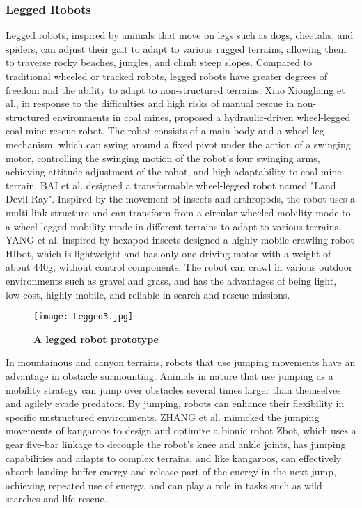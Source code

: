 \documentclass[conference]{IEEEtran}
\begin{document}
\subsubsection{Legged Robots}
Legged robots, inspired by animals that move on legs such as dogs, cheetahs, and spiders, can adjust their gait to adapt to various rugged terrains, allowing them to traverse rocky beaches, jungles, and climb steep slopes. Compared to traditional wheeled or tracked robots, legged robots have greater degrees of freedom and the ability to adapt to non-structured terrains\cite{b31}. Xiao Xiongliang et al.\cite{b32}, in response to the difficulties and high risks of manual rescue in non-structured environments in coal mines, proposed a hydraulic-driven wheel-legged coal mine rescue robot. The robot consists of a main body and a wheel-leg mechanism, which can swing around a fixed pivot under the action of a swinging motor, controlling the swinging motion of the robot's four swinging arms, achieving attitude adjustment of the robot, and high adaptability to coal mine terrain. BAI et al. \cite{b33} designed a transformable wheel-legged robot named "Land Devil Ray". Inspired by the movement of insects and arthropods, the robot uses a multi-link structure and can transform from a circular wheeled mobility mode to a wheel-legged mobility mode in different terrains to adapt to various terrains. YANG et al. \cite{b34} inspired by hexapod insects designed a highly mobile crawling robot HIbot, which is lightweight and has only one driving motor with a weight of about 440g, without control components. The robot can crawl in various outdoor environments such as gravel and grass, and has the advantages of being light, low-cost, highly mobile, and reliable in search and rescue missions.

\begin{figure}[h]
    \centering
    \texttt{[image: Legged3.jpg]}
    \caption{\textbf{A legged robot prototype}}
    \label{fig:enter-label}
\end{figure}

In mountainous and canyon terrains, robots that use jumping movements have an advantage in obstacle surmounting. Animals in nature that use jumping as a mobility strategy can jump over obstacles several times larger than themselves and agilely evade predators. By jumping, robots can enhance their flexibility in specific unstructured environments. ZHANG et al. \cite{b35} mimicked the jumping movements of kangaroos to design and optimize a bionic robot Zbot, which uses a gear five-bar linkage to decouple the robot's knee and ankle joints, has jumping capabilities and adapts to complex terrains, and like kangaroos, can effectively absorb landing buffer energy and release part of the energy in the next jump, achieving repeated use of energy, and can play a role in tasks such as wild searches and life rescue.
\end{document}
